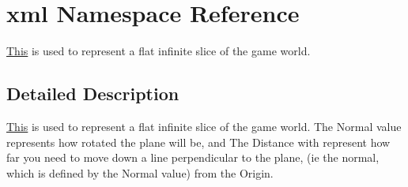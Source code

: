 \hypertarget{namespacexml}{
\section{xml Namespace Reference}
\label{d8/dd3/namespacexml}
}


\hyperlink{structThis}{This} is used to represent a flat infinite slice of the game world.  




\subsection{Detailed Description}
\hyperlink{structThis}{This} is used to represent a flat infinite slice of the game world. The Normal value represents how rotated the plane will be, and The Distance with represent how far you need to move down a line perpendicular to the plane, (ie the normal, which is defined by the Normal value) from the Origin. 